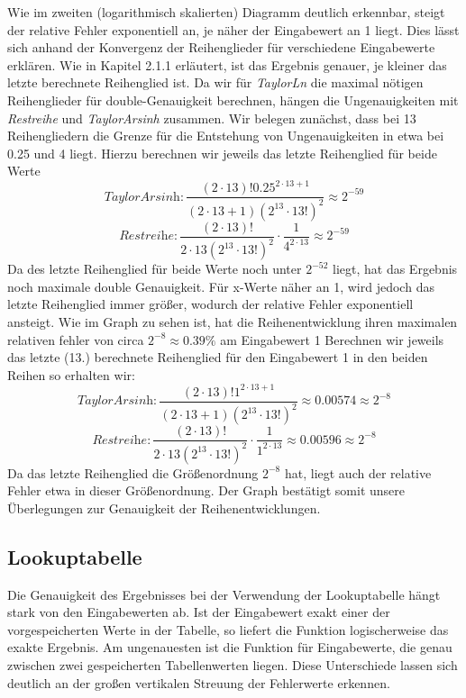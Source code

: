 \documentclass[course=erap] {aspdoc}
\begin{document}
     Wie im zweiten (logarithmisch skalierten) Diagramm deutlich erkennbar, steigt der relative Fehler exponentiell an, je näher der Eingabewert an 1 liegt. Dies lässt sich  anhand der Konvergenz der Reihenglieder für verschiedene Eingabewerte erklären. Wie in Kapitel 2.1.1 erläutert, ist das Ergebnis genauer, je kleiner das letzte berechnete Reihenglied ist. Da wir für \textit{TaylorLn} die maximal nötigen Reihenglieder für double-Genauigkeit berechnen, hängen die Ungenauigkeiten mit \textit{Restreihe} und \textit{TaylorArsinh} zusammen. 
     Wir belegen zunächst, dass bei 13 Reihengliedern die Grenze für die Entstehung von Ungenauigkeiten in etwa bei 0.25 und 4 liegt. Hierzu berechnen wir jeweils das letzte Reihenglied für beide Werte 
     \[
     \textit{TaylorArsinh}: \frac{(2\cdot13)!0.25^{2\cdot13 + 1}}{(2\cdot13 + 1)(2^13\cdot13!)^2} \approx 2^{-59}
     \]
     \[
     \textit{Restreihe}: \frac{(2\cdot13)!}{2\cdot13(2^{13}\cdot 13!)^2} \cdot \frac{1}{4^{2\cdot13}} \approx 2^{-59}
     \]
     Da des letzte Reihenglied für beide Werte noch unter $2^{-52}$ liegt, hat das Ergebnis noch maximale double Genauigkeit. Für x-Werte näher an 1, wird jedoch das letzte Reihenglied immer größer, wodurch der relative Fehler exponentiell ansteigt. Wie im Graph zu sehen ist, hat die Reihenentwicklung ihren maximalen relativen fehler von circa $2^{-8} \approx 0.39\%$ am Eingabewert 1
     Berechnen wir jeweils das letzte (13.) berechnete Reihenglied für den Eingabewert 1 in den beiden Reihen so erhalten wir:
     \[
     \textit{TaylorArsinh}: \frac{(2\cdot13)!1^{2\cdot13 + 1}}{(2\cdot13 + 1)(2^13\cdot13!)^2} \approx 0.00574 \approx 2^{-8}
     \]
     \[
     \textit{Restreihe}: \frac{(2\cdot13)!}{2\cdot13(2^{13}\cdot 13!)^2} \cdot \frac{1}{1^{2\cdot13}} \approx 0.00596 \approx 2^{-8}
     \]
     Da das letzte Reihenglied die Größenordnung $2^{-8}$ hat, liegt auch der relative Fehler etwa in dieser Größenordnung. Der Graph bestätigt somit unsere Überlegungen zur Genauigkeit der Reihenentwicklungen. 
     
     
     \subsection{Lookuptabelle}
     Die Genauigkeit des Ergebnisses bei der Verwendung der Lookuptabelle hängt stark von den Eingabewerten ab. Ist der Eingabewert exakt einer der vorgespeicherten Werte in der Tabelle, so liefert die Funktion logischerweise das exakte Ergebnis. Am ungenauesten ist die Funktion für Eingabewerte, die genau zwischen zwei gespeicherten Tabellenwerten liegen. Diese Unterschiede lassen sich deutlich an der großen vertikalen Streuung der Fehlerwerte erkennen.
     
\end{document}

